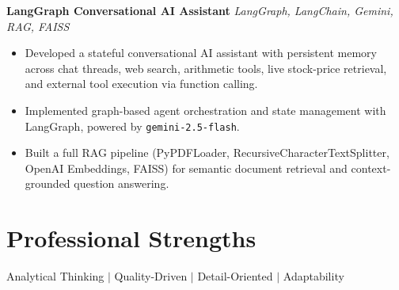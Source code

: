 \documentclass[10pt,letterpaper]{article}
\newcommand{\resumeProject}[2]{
    \textbf{#1} \hfill \textit{#2}
}
\newcommand{\resumeItem}[1]{
    \item #1
}
\begin{document}
\resumeProject{LangGraph Conversational AI Assistant }{LangGraph, LangChain, Gemini, RAG, FAISS}

\begin{itemize}
    \resumeItem{Developed a stateful conversational AI assistant with persistent memory across chat threads, web search, arithmetic tools, live stock-price retrieval, and external tool execution via function calling.}
    \resumeItem{Implemented graph-based agent orchestration and state management with LangGraph, powered by \texttt{gemini-2.5-flash}.}
    \resumeItem{Built a full RAG pipeline (PyPDFLoader, RecursiveCharacterTextSplitter, OpenAI Embeddings, FAISS) for semantic document retrieval and context-grounded question answering.}
\end{itemize}

\section{Professional Strengths}
 \begin{itemize}[leftmargin=0.15in, label={}]
    \small{\item{
     Analytical Thinking $|$ Quality-Driven $|$ Detail-Oriented $|$ Adaptability
    }}
 \end{itemize}

\end{document}
